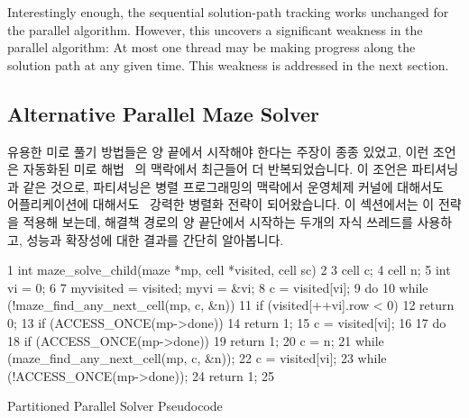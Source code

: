 Interestingly enough, the sequential solution-path tracking works unchanged
for the parallel algorithm.
However, this uncovers a significant weakness in the parallel algorithm:
At most one thread may be making progress along the solution path at
any given time.
This weakness is addressed in the next section.
\fi

\subsection{Alternative Parallel Maze Solver}
\label{sec:SMPdesign:Alternative Parallel Maze Solver}

유용한 미로 풀기 방법들은 양 끝에서 시작해야 한다는 주장이 종종 있었고, 이런
조언은 자동화된 미로 해법~\cite{UMD:CMSC433maze} 의 맥락에서 최근들어 더
반복되었습니다.
이 조언은 파티셔닝과 같은 것으로, 파티셔닝은 병렬 프로그래밍의 맥락에서
운영체제 커널에 대해서도~\cite{Beck85,Inman85} 어플리케이션에
대해서도~\cite{DavidAPatterson2010TroubleMulticore} 강력한 병렬화 전략이
되어왔습니다.
이 섹션에서는 이 전략을 적용해 보는데, 해결책 경로의 양 끝단에서 시작하는
두개의 자식 쓰레드를 사용하고, 성능과 확장성에 대한 결과를 간단히 알아봅니다.

\begin{listing}[tbp]
{ \scriptsize
\begin{verbbox}
  1 int maze_solve_child(maze *mp, cell *visited, cell sc)
  2 {
  3   cell c;
  4   cell n;
  5   int vi = 0;
  6 
  7   myvisited = visited; myvi = &vi;
  8   c = visited[vi];
  9   do {
 10     while (!maze_find_any_next_cell(mp, c, &n)) {
 11       if (visited[++vi].row < 0)
 12         return 0;
 13       if (ACCESS_ONCE(mp->done))
 14         return 1;
 15       c = visited[vi];
 16     }
 17     do {
 18       if (ACCESS_ONCE(mp->done))
 19         return 1;
 20       c = n;
 21     } while (maze_find_any_next_cell(mp, c, &n));
 22     c = visited[vi];
 23   } while (!ACCESS_ONCE(mp->done));
 24   return 1;
 25 }
\end{verbbox}
}
\centering
\theverbbox
\caption{Partitioned Parallel Solver Pseudocode}
\label{lst:SMPdesign:Partitioned Parallel Solver Pseudocode}
\end{listing}

